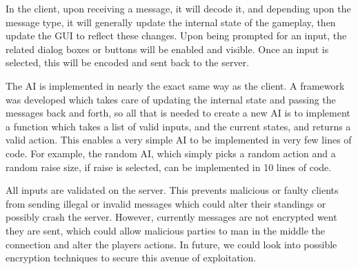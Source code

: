 In the client, upon receiving a message, it will decode it, and depending upon
the message type, it will generally update the internal state of the gameplay,
then update the GUI to reflect these changes. Upon being prompted for an
input, the related dialog boxes or buttons will be enabled and visible.
Once an input is selected, this will be encoded and sent back to the server.

The AI is implemented in nearly the exact same way as the client. A framework
was developed which takes care of updating the internal state and passing the
messages back and forth, so all that is needed to create a new AI is to
implement a function which takes a list of valid inputs, and the current
states, and returns a valid action. This enables a very simple AI to be
implemented in very few lines of code. For example, the random AI, which simply
picks a random action and a random raise size, if raise is selected, can
be implemented in 10 lines of code.

All inputs are validated on the server. This prevents malicious or faulty
clients from sending illegal or invalid messages which could alter their
standings or possibly crash the server. However, currently messages are not
encrypted went they are sent, which could allow malicious parties to man in the
middle the connection and alter the players actions. In future, we could look
into possible encryption techniques to secure this avenue of exploitation.
